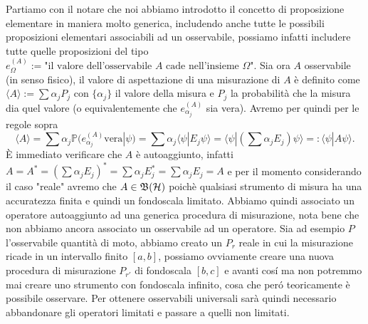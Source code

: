 Partiamo con il notare che noi abbiamo introdotto il concetto di proposizione elementare in maniera molto generica, includendo anche tutte le possibili proposizioni elementari associabili ad un osservabile, possiamo infatti includere tutte quelle proposizioni del tipo $e^{(A)}_\Omega := \text{"il valore dell'osservabile $A$ cade nell'insieme $\Omega$"}$. Sia ora $A$ osservabile (in senso fisico), il valore di aspettazione di una misurazione di $A$ è definito come $\langle A \rangle := \sum \alpha_j P_j$ con $\{ \alpha_j\}$ il valore della misura e $P_j$ la probabilità che la misura dia quel valore (o equivalentemente che $e^{(A)}_{\alpha_j}$ sia vera). Avremo per quindi per le regole sopra $$\langle A \rangle = \sum \alpha_j \mathbb{P} (e^{(A)}_{\alpha_j} \text{vera}|\psi) = \sum \alpha_j \langle \psi | E_j \psi \rangle = \langle \psi | (\sum \alpha_j E_j) \psi \rangle =: \langle \psi | A \psi \rangle.$$ È immediato verificare che $A$ è autoaggiunto, infatti $A = A^*= (\sum \alpha_j E_j)^* = \sum \alpha_j E_j^* = \sum \alpha_j E_j = A$ e per il momento considerando il caso "reale" avremo che $A \in \operatorname{\mathfrak{B}(\mathcal{H})}$ poichè qualsiasi strumento di misura ha una accuratezza finita e quindi un fondoscala limitato. Abbiamo quindi associato un operatore autoaggiunto ad una generica procedura di misurazione, nota bene che non abbiamo ancora associato un osservabile ad un operatore. Sia ad esempio $P$ l'osservabile quantità di moto, abbiamo creato un $P_r$ reale in cui la misurazione ricade in un intervallo finito $[a,b]$, possiamo ovviamente creare una nuova procedura di misurazione $P_{r'}$ di fondoscala $[b,c]$ e avanti cosí ma non potremmo mai creare uno strumento con fondoscala infinito, cosa che peró teoricamente è possibile osservare. Per ottenere osservabili universali sarà quindi necessario abbandonare gli operatori limitati e passare a quelli non limitati.
